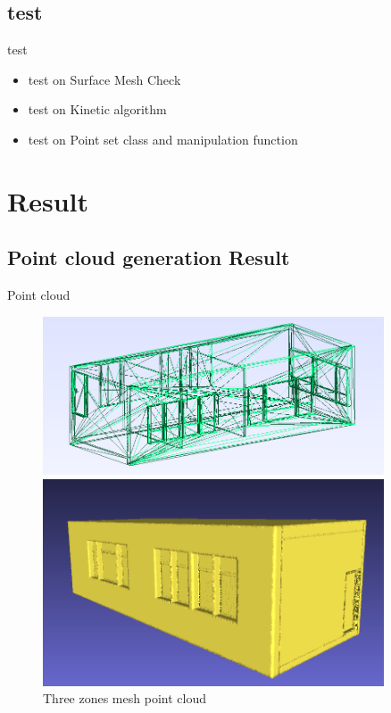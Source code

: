 \documentclass[10pt]{beamer}
\begin{document}
\subsection{test}
\begin{frame}{test}
    \begin{itemize}
        \item test on Surface Mesh Check
        \item test on Kinetic algorithm
        \item test on Point set class and manipulation function
    \end{itemize}
\end{frame}

\section{Result}
\subsection{Point cloud generation Result}
\begin{frame}{Point cloud}
    \begin{figure}
        \begin{minipage}{0.45\textwidth}
            \centering
            \includegraphics[width=0.9\textwidth]{../image/3zones_stl.png}
        \end{minipage}%
        \begin{minipage}{0.45\textwidth}
            \centering
            \includegraphics[width=0.9\textwidth]{../image/3zones_ply.png}
        \end{minipage}
        \caption{Three zones mesh point cloud}
    \end{figure}
\end{frame}
\end{document}
